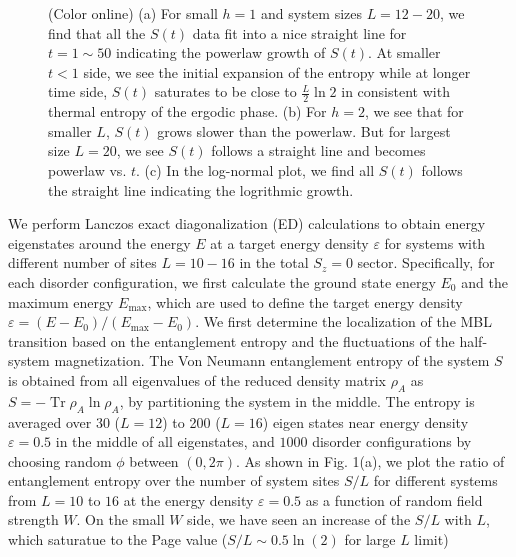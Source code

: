 \documentclass[prl,aps,epsf,showpacs,twocolumn]{revtex4}
\DeclareMathOperator{\tr}{Tr}
\begin{document}
\begin{figure}[b]
  \caption{(Color online) (a) For small $h=1$ and system sizes $L=12-20$,   we
    find that all the $S(t)$ data fit into a nice straight line for $t=1\sim 50$
    indicating the powerlaw growth of $S(t)$.  At smaller $t<1$ side,  we see
    the initial expansion of the entropy  while at longer time  side, $S(t)$
    saturates to be close to $\frac L 2 \ln2$ in consistent with thermal entropy
    of the ergodic phase.  (b) For $h=2$,  we see that for smaller $L$, $S(t)$
    grows slower than the powerlaw.  But for largest size $L=20$, we see $S(t)$
    follows a straight line and becomes powerlaw vs. $t$.  (c) In the log-normal
    plot, we find all $S(t)$ follows the straight line indicating the logrithmic
    growth.
  }
\label{fig5}
\end{figure} 


We  perform Lanczos exact diagonalization (ED) calculations   to obtain  energy
eigenstates around  the energy $E$ at a target  energy  density $\varepsilon$
for  systems with different  number of sites $L=10-16$  in the total $S_z=0$
sector.  Specifically, for each disorder configuration, we first calculate the
ground state energy  $E_0$ and the maximum energy $E_\text{max}$, which are used
to define the target energy density $\varepsilon = (E-E_0)/(E_\text{max} -E_0)$.
We first determine the localization of the MBL transition based on the
entanglement entropy and the fluctuations of the half-system
magnetization\cite{luitz2015}.  The Von Neumann entanglement entropy of the
system  $S$ is obtained  from all eigenvalues of the reduced density matrix
$\rho_A$ as $S=- \tr \rho_A \ln \rho_A$, by partitioning the system in  the
middle.  The entropy is averaged over 30 ($L=12$) to 200 ($L=16$) eigen states
near energy density $\varepsilon=0.5$ in the middle of all eigenstates,   and
$1000$ disorder configurations by choosing random $\phi$ between $(0, 2\pi)$.
As shown in  Fig. 1(a), we plot the  ratio of  entanglement entropy over the
number of system sites  $S/L$ for  different systems  from $L=10$ to $16$  at
the energy density $\varepsilon =0.5$ as a function of random field strength
$W$.  On the  small $W$ side, we have seen an increase of the $S/L$ with $L$,
which saturatue to the Page value ($S/L \sim 0.5\ln(2)$ for large $L$ limit)
\end{document}
